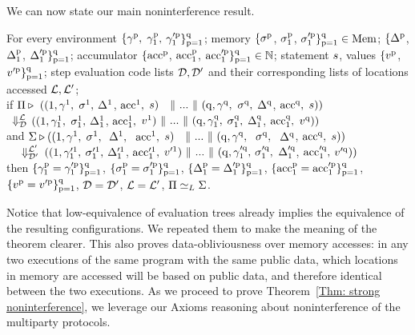 We can now state our main noninterference result. 
\begin{theorem}
\label{Thm: strong noninterference}
For every environment $\{\gamma^{\mathrm{{p}}}_{},$ $\gamma^{\mathrm{{p}}}_{1},$ $\gamma'^{\mathrm{{p}}}_{1}\}^{\mathrm{{q}}}_{\mathrm{{p}} = \mathrm{{1}}}$; 
memory $\{\sigma^{\mathrm{{p}}}_{}$, $\sigma^{\mathrm{{p}}}_{1}$, $\sigma'^{\mathrm{{p}}}_{1} \}^{\mathrm{{q}}}_{\mathrm{{p}} = \mathrm{{1}}}\in\mathrm{Mem}$; 
\changeMap $\{\Delta^{\mathrm{{p}}}_{}$, $\Delta^{\mathrm{{p}}}_{1}$, $\Delta'^{\mathrm{{p}}}_{1}\}^{\mathrm{{q}}}_{\mathrm{{p}} = \mathrm{{1}}}$;
accumulator $\{\mathrm{acc}^{\mathrm{{p}}}_{}$, $\mathrm{acc}^{\mathrm{{p}}}_{1}$, $\mathrm{acc}'^{\mathrm{{p}}}_{1}\}^{\mathrm{{q}}}_{\mathrm{{p}} = \mathrm{{1}}}\in\mathbb{N}$; 
statement $s$, values $\{v^{\mathrm{{p}}}_{}$, $v'^{\mathrm{{p}}}_{}\}^{\mathrm{{q}}}_{\mathrm{{p}} = \mathrm{{1}}}$; 
step evaluation code lists $\mathcal{D},\mathcal{D}'$ and their corresponding lists of locations accessed $\mathcal{L},\mathcal{L}'$; 
\\
if 
$\Pi \triangleright\ ((\mathrm{{1}}, \gamma^{\mathrm{{1}}}_{},$ $\sigma^{\mathrm{{1}}}_{},$ $\Delta^{\mathrm{{1}}}_{}$, $\mathrm{acc}^{\mathrm{{1}}}_{},$ $s)\ \ \-\ \Vert\  ...\-\ \Vert\  (\mathrm{{q}}, \gamma^{\mathrm{{q}}}_{},$ $\sigma^{\mathrm{{q}}}_{},$ $\Delta^{\mathrm{{q}}}_{}$, $\mathrm{acc}^{\mathrm{{q}}}_{},$ $s))$ 
\\ \-\ \quad $\Downarrow^{\mathcal{L}}_\mathit{\mathcal{D}}$ $((\mathrm{{1}}, \gamma^{\mathrm{{1}}}_{1},$ $\sigma^{\mathrm{{1}}}_{1},$ $\Delta^{\mathrm{{1}}}_{1}$, $\mathrm{acc}^{\mathrm{{1}}}_{1},$ $v^{\mathrm{{1}}}_{})\-\ \Vert\  ...\-\ \Vert\  (\mathrm{{q}}, \gamma^{\mathrm{{q}}}_{1},$ $\sigma^{\mathrm{{q}}}_{1},$ $\Delta^{\mathrm{{q}}}_{1}$, $\mathrm{acc}^{\mathrm{{q}}}_{1},$ $v^{\mathrm{{q}}}_{}))$ 
\\ and   
$\Sigma \triangleright ((\mathrm{{1}}, \gamma^{\mathrm{{1}}}_{},$ $\sigma^{\mathrm{{1}}}_{},\ $ $\Delta^{\mathrm{{1}}}_{},\ $ $\mathrm{acc}^{\mathrm{{1}}}_{},$ $\stmt)\ \ \Mid ...\Mid (\pidZ, \gamma^{\pidZ}_{},\ $ $\sigma^{\mathrm{{q}}}_{},\ $ $\Delta^{\mathrm{{q}}}_{}$, $\mathrm{acc}^{\mathrm{{q}}}_{},$ $s))$ 
\\ $\-\ \quad \Downarrow^{\mathcal{L}'}_\mathit{\mathcal{D}'}$ $((\mathrm{{1}}, \gamma'^{\mathrm{{1}}}_{1},$ $\sigma'^{\mathrm{{1}}}_{1},$ $\Delta'^{\mathrm{{1}}}_{1}$, $\mathrm{acc}'^{\mathrm{{1}}}_{1},$ $v'^{\mathrm{{1}}}_{})\-\ \Vert\  ...\-\ \Vert\  (\mathrm{{q}}, \gamma'^{\mathrm{{q}}}_{1},$ $\sigma'^{\mathrm{{q}}}_{1},$ $\Delta'^{\mathrm{{q}}}_{1}$, $\mathrm{acc}'^{\mathrm{{q}}}_{1},$ $v'^{\mathrm{{q}}}_{}))$
\\ then $\{\gamma^{\mathrm{{p}}}_{1}=\gamma'^{\mathrm{{p}}}_{1}\}^{\mathrm{{q}}}_{\mathrm{{p}} = \mathrm{{1}}}$, 
$\{\sigma^{\mathrm{{p}}}_{1}=\sigma'^{\mathrm{{p}}}_{1}\}^{\mathrm{{q}}}_{\mathrm{{p}} = \mathrm{{1}}}$, 
$\{\Delta^{\mathrm{{p}}}_{1} =\Delta'^{\mathrm{{p}}}_{1}\}^{\mathrm{{q}}}_{\mathrm{{p}} = \mathrm{{1}}}$, 
$\{\mathrm{acc}^{\mathrm{{p}}}_{1}=\mathrm{acc}'^{\mathrm{{p}}}_{1}\}^{\mathrm{{q}}}_{\mathrm{{p}} = \mathrm{{1}}}$, 
$\{v^{\mathrm{{p}}}_{}=v'^{\mathrm{{p}}}_{}\}^{\mathrm{{q}}}_{\mathrm{{p}} = \mathrm{{1}}}$, 
$\mathcal{D}=\mathcal{D}'$, 
$\mathcal{L} = \mathcal{L}'$, 
$\Pi \simeq_L \Sigma$.
\end{theorem} 
%
Notice that low-equivalence of evaluation trees already implies the equivalence of the resulting configurations. We repeated them to make the meaning of the theorem clearer. 
This also proves data-obliviousness over memory accesses: in any two executions of the same program with the same public data, which locations in memory are accessed will be based on public data, and therefore identical between the two executions. 
As we proceed to prove Theorem~\ref{Thm: strong noninterference}, we leverage our Axioms reasoning about noninterference of the multiparty protocols.









